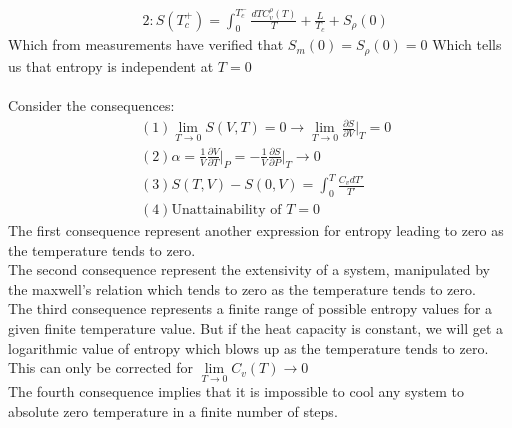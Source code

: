 \documentclass[12pt,a4paper]{article}
\begin{document}
\begin{enumerate}
\begin{align*}
    &2: S(T_c^{+}) = \int_{0}^{T_c^{-}}\frac{dTC_v^{\rho}(T)}{T} + \frac{L}{T_c} + S_\rho(0)
    \end{align*}
    Which from measurements have verified that $S_m(0) = S_\rho(0)  = 0$ Which tells us that entropy is independent at $T = 0$\\
    \\
    Consider the consequences:
    \begin{align*}
    &(1) \lim\limits_{T\rightarrow 0}S(V,T) = 0  \rightarrow \lim\limits_{T\rightarrow 0}\frac{\partial S}{\partial V}\bigg|_T =0\\
    &(2) \alpha = \frac{1}{V}\frac{\partial V}{\partial T}\bigg|_P = -\frac{1}{V}\frac{\partial S}{\partial P}\bigg|_T \rightarrow 0\\
    &(3) S(T,V) - S(0,V) = \int_{0}^{T}\frac{C_vdT'}{T'}\\
    &(4) \text{Unattainability of $T=0$}
    \end{align*}
    The first consequence represent another expression for entropy leading to zero as the temperature tends to zero.\\
    The second consequence represent the extensivity of a system, manipulated by the maxwell's relation which tends to zero as the temperature tends to zero.\\
    The third consequence represents a finite range of possible entropy values for a given finite temperature value. But if the heat capacity is constant, we will get a logarithmic value of entropy which blows up as the temperature tends to zero. This can only be corrected for $\lim\limits_{T\rightarrow 0} C_v(T) \rightarrow 0$\\
    The fourth consequence implies that it is impossible to cool any system to absolute zero temperature in a finite number of steps. 
\end{enumerate}
	
\end{document}
